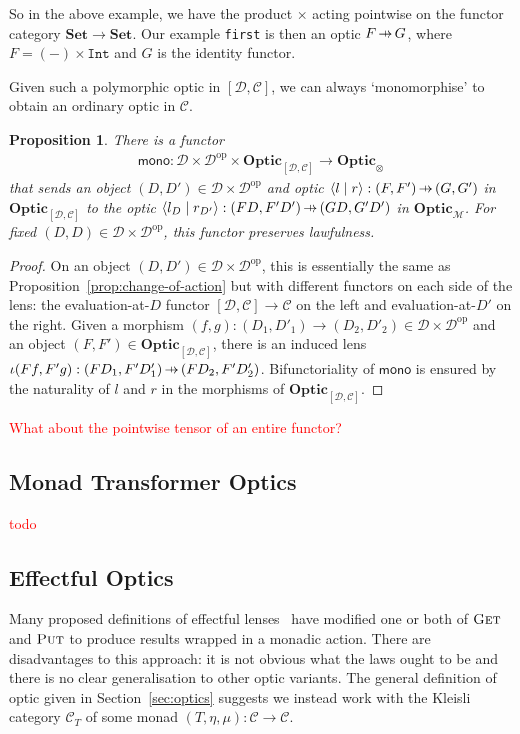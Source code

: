 \documentclass[11pt,a4paper]{article}
\theoremstyle{plain}
\newtheorem{proposition}[theorem]{Proposition}
\theoremstyle{definition}
\newcommand{\C}{\mathscr{C}}
\newcommand{\D}{\mathscr{D}}
\newcommand{\M}{\mathscr{M}}
\newcommand{\Set}{\mathbf{Set}}
\newcommand{\Optic}{\mathbf{Optic}}
\newcommand{\op}{\mathrm{op}}
\newcommand{\rep}[2]{{\ensuremath \left\langle #1 \mid #2 \right\rangle}}
\newcommand{\fget}{\textsc{Get}}
\newcommand{\fput}{\textsc{Put}}
\newcommand{\hto}{\ensuremath{\,\mathaccent\shortmid\rightarrow\,}}
\newcommand{\todo}[1]{\textcolor{red}{\small #1}}
\begin{document}
So in the above example, we have the product $\times$ acting pointwise on the functor category $\Set \to \Set$. Our example \texttt{first} is then an optic $F \hto G$, where $F = (-) \times \texttt{Int}$ and $G$ is the identity functor.

Given such a polymorphic optic in $[\D, \C]$, we can always `monomorphise' to obtain an ordinary optic in $\C$.
\begin{proposition}
  There is a functor
  \begin{align*}
    \mathsf{mono} : \D \times \D^\op \times \Optic_{[\D, \C]} \to \Optic_\otimes
  \end{align*}
  that sends an object $(D, D') \in \D \times \D^\op$ and optic $\rep{l}{r} : (F, F') \hto (G, G')$ in $\Optic_{[\D, \C]}$ to the optic $\rep{l_D}{r_{D'}} : (FD, F'D') \hto (GD, G'D')$ in $\Optic_\M$. For fixed $(D, D) \in \D \times \D^\op$, this functor preserves lawfulness.
\end{proposition}
\begin{proof}
  On an object $(D, D') \in \D \times \D^\op$, this is essentially the same as Proposition~\ref{prop:change-of-action} but with different functors on each side of the lens: the evaluation-at-$D$ functor $[\D, \C] \to \C$ on the left and evaluation-at-$D'$ on the right.
  Given a morphism $(f, g) : (D_1, D'_1) \to (D_2, D'_2) \in \D \times \D^\op$ and an object $(F, F') \in \Optic_{[\D, \C]}$, there is an induced lens $\iota(Ff, F'g) : (FD_1, F'D'_1) \hto (FD_2, F'D'_2)$. Bifunctoriality of $\mathsf{mono}$ is ensured by the naturality of $l$ and $r$ in the morphisms of $\Optic_{[\D, \C]}$.
\end{proof}

\todo{What about the pointwise tensor of an entire functor?}

\subsection{Monad Transformer Optics}

\todo{todo}


\subsection{Effectful Optics}
\newcommand{\monact}{\ltimes}

Many proposed definitions of effectful lenses~\cite{ReflectionsOnMonadicLenses} have modified one or both of $\fget$ and $\fput$ to produce results wrapped in a monadic action. There are disadvantages to this approach: it is not obvious what the laws ought to be and there is no clear generalisation to other optic variants. The general definition of optic given in Section~\ref{sec:optics} suggests we instead work with the Kleisli category $\C_T$ of some monad $(T, \eta, \mu) : \C \to \C$.
\end{document}
